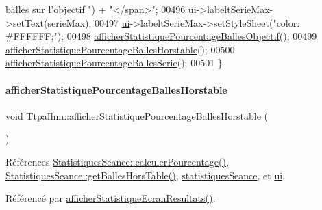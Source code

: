 \begin{DoxyCode}
{       balles sur l'objectif "}) + \textcolor{stringliteral}{"</span>"};
00496     \hyperlink{class_ttpa_ihm_ad5fae1222a667da158c26f3d0f0dce23}{ui}->labeltSerieMax->setText(serieMax);
00497     \hyperlink{class_ttpa_ihm_ad5fae1222a667da158c26f3d0f0dce23}{ui}->labeltSerieMax->setStyleSheet(\textcolor{stringliteral}{"color: #FFFFFF;"});
00498     \hyperlink{class_ttpa_ihm_ac37d57d13301cda22f062219de8731c4}{afficherStatistiquePourcentageBallesObjectif}();
00499     \hyperlink{class_ttpa_ihm_a58058063eb377b4c4c48048e4bf84e77}{afficherStatistiquePourcentageBallesHorstable}();
00500     \hyperlink{class_ttpa_ihm_aec988dc2398578eb8e91563d1ba58cde}{afficherStatistiquePourcentageBallesSerie}();
00501 \}
\end{DoxyCode}
\mbox{\label{class_ttpa_ihm_a58058063eb377b4c4c48048e4bf84e77}} 
\paragraph{\texorpdfstring{afficher\+Statistique\+Pourcentage\+Balles\+Horstable}{afficherStatistiquePourcentageBallesHorstable}}
{\footnotesize\ttfamily void Ttpa\+Ihm\+::afficher\+Statistique\+Pourcentage\+Balles\+Horstable (\begin{DoxyParamCaption}{ }\end{DoxyParamCaption})\hspace{0.3cm}{\ttfamily [slot]}}



Références \hyperlink{class_statistiques_seance_a67759edd6c296bd6b66f7860dbac130e}{Statistiques\+Seance\+::calculer\+Pourcentage()}, \hyperlink{class_statistiques_seance_a26b717d40065e7afd80465458f3cb6aa}{Statistiques\+Seance\+::get\+Balles\+Hors\+Table()}, \hyperlink{class_ttpa_ihm_abed6897d6f7b4d3a5eb8dcc07651e740}{statistiques\+Seance}, et \hyperlink{class_ttpa_ihm_ad5fae1222a667da158c26f3d0f0dce23}{ui}.



Référencé par \hyperlink{class_ttpa_ihm_aa480a02532144d0f99af027b5b201ae1}{afficher\+Statistique\+Ecran\+Resultats()}.


